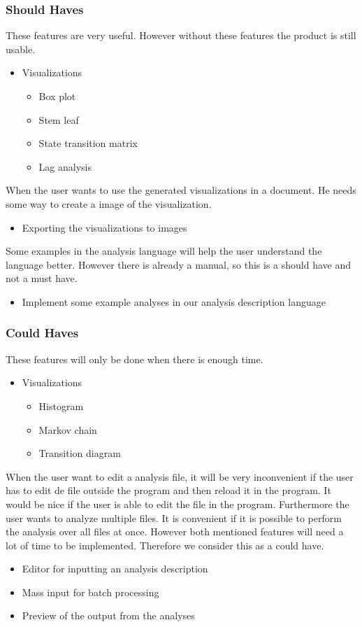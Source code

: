 \subsubsection{Should Haves}
These features are very useful. However without these features the product is still usable.
\begin{itemize}
	\item Visualizations
    \begin{itemize}
    	\item Box plot
        \item Stem leaf
        \item State transition matrix
        \item Lag analysis
    \end{itemize}
 \end{itemize}
   When the user wants to use the generated visualizations in a document. He needs some way to create a image of the visualization.
 \begin{itemize}
	\item Exporting the visualizations to images
\end{itemize}
Some examples in the analysis language will help the user understand the language better. However there is already a manual, so this is a should have and not a must have.
\begin{itemize}
    \item Implement some example analyses in our analysis description language
\end{itemize}

\subsubsection{Could Haves}
These features will only be done when there is enough time.
 \begin{itemize}
  \item Visualizations
  \begin{itemize}
	  \item Histogram
      \item Markov chain
      \item Transition diagram
  \end{itemize}
\end{itemize}
When the user want to edit a analysis file, it will be very inconvenient if the user has to edit de file outside the program and then reload it in the program. It would be nice if the user is able to edit the file in the program. Furthermore the user wants to analyze multiple files. It is convenient if it is possible to perform the analysis over all files at once. However both mentioned features will need a lot of time to be implemented. Therefore we consider this as a could have.
\begin{itemize}
  \item Editor for inputting an analysis description 
  \item Mass input for batch processing 
  \item Preview of the output from the analyses
\end{itemize}

